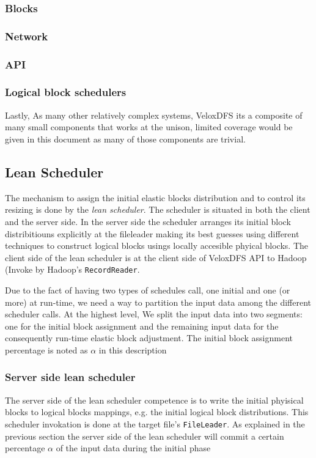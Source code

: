 \subsubsection{Blocks}
\lipsum[10]
\subsubsection{Network}
\lipsum[10]
\subsubsection{API}
\lipsum[10]

\subsubsection{Logical block schedulers}
\lipsum[10]

Lastly, As many other relatively complex systems, VeloxDFS its a composite of many small components that works at the unison, limited coverage would be given in this document as many of those components are trivial.


\subsection{Lean Scheduler}
The mechanism to assign the initial elastic blocks distribution and to control its resizing is done by the \textit{lean scheduler}. The scheduler is situated in both the client and the server side. In the server side the scheduler arranges its initial block distribitiouns explicitly at the fileleader making its best guesses using different techniques to construct logical blocks usings locally accesible phyical blocks. The client side of the lean scheduler is at the client side of VeloxDFS API to Hadoop (Invoke by Hadoop's \texttt{RecordReader}.

Due to the fact of having two types of schedules call, one initial and one (or more) at run-time, we need a way to partition the input data 
among the different scheduler calls. At the highest level, We split the input data into two segments: one for the initial block assignment and the remaining input data for the consequently run-time elastic block adjustment. The initial block assignment percentage is noted as $\alpha$ in this description

\subsubsection{Server side lean scheduler}
The server side of the lean scheduler competence is to write the initial phyisical blocks to logical blocks mappings, e.g. the initial logical block distributions. This scheduler invokation is done at the target file's \texttt{FileLeader}. As explained in the previous section the server side of the lean scheduler will commit a certain percentage $\alpha$ of the input data during the initial phase 

